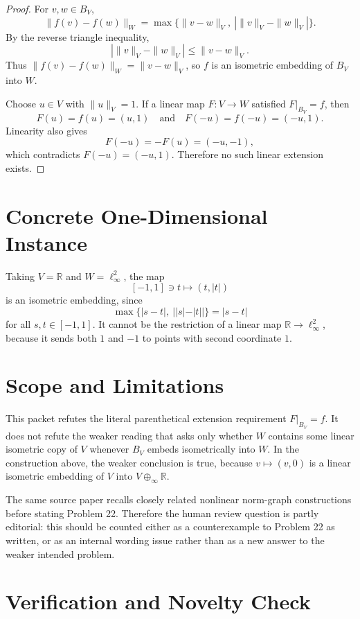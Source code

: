 \documentclass[11pt]{article}
\newcommand{\RR}{\mathbb R}
\begin{document}
\begin{proof}
For \(v,w\in B_V\),
\[
  \|f(v)-f(w)\|_W
  =\max\{\|v-w\|_V,\ |\|v\|_V-\|w\|_V|\}.
\]
By the reverse triangle inequality,
\[
  |\|v\|_V-\|w\|_V|\le \|v-w\|_V.
\]
Thus \(\|f(v)-f(w)\|_W=\|v-w\|_V\), so \(f\) is an isometric embedding of
\(B_V\) into \(W\).

Choose \(u\in V\) with \(\|u\|_V=1\). If a linear map \(F:V\to W\) satisfied
\(F|_{B_V}=f\), then
\[
  F(u)=f(u)=(u,1)
  \quad\text{and}\quad
  F(-u)=f(-u)=(-u,1).
\]
Linearity also gives
\[
  F(-u)=-F(u)=(-u,-1),
\]
which contradicts \(F(-u)=(-u,1)\). Therefore no such linear extension exists.
\end{proof}

\section*{Concrete One-Dimensional Instance}

Taking \(V=\RR\) and \(W=\ell_\infty^2\), the map
\[
  [-1,1]\ni t\longmapsto(t,|t|)
\]
is an isometric embedding, since
\[
  \max\{|s-t|,\ ||s|-|t||\}=|s-t|
\]
for all \(s,t\in[-1,1]\). It cannot be the restriction of a linear map
\(\RR\to\ell_\infty^2\), because it sends both \(1\) and \(-1\) to points
with second coordinate \(1\).

\section*{Scope and Limitations}

This packet refutes the literal parenthetical extension requirement
\(F|_{B_V}=f\). It does not refute the weaker reading that asks only whether
\(W\) contains some linear isometric copy of \(V\) whenever \(B_V\) embeds
isometrically into \(W\). In the construction above, the weaker conclusion is
true, because \(v\mapsto(v,0)\) is a linear isometric embedding of \(V\) into
\(V\oplus_\infty\RR\).

The same source paper recalls closely related nonlinear norm-graph
constructions before stating Problem 22. Therefore the human review question is
partly editorial: this should be counted either as a counterexample to Problem
22 as written, or as an internal wording issue rather than as a new answer to
the weaker intended problem.

\section*{Verification and Novelty Check}
\end{document}
